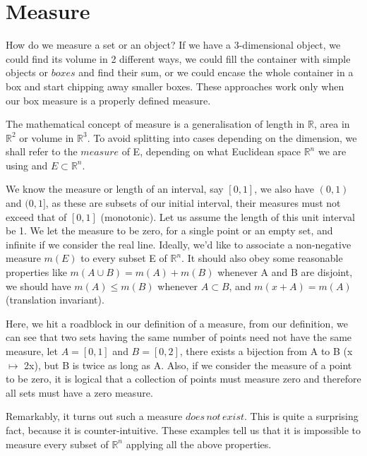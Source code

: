 \documentclass{article}
\begin{document}
\section{Measure}

How do we measure a set or an object? If we have a 3-dimensional object, we could find its volume in 2 different ways, we could fill the container with simple objects or $boxes$ and find their sum, or we could encase the whole container in a box and start chipping away smaller boxes. These approaches work only when our box measure is a properly defined measure.\medskip

The mathematical concept of measure is a generalisation of length in $\mathbb{R}$, area in $\mathbb{R}^2$ or volume in $\mathbb{R}^3$. To avoid splitting into cases depending on the dimension, we shall refer to the $measure$ of E, depending on what Euclidean space $\mathbb{R}^n$ we are using and $E \subset \mathbb{R}^n$.\medskip

We know the measure or length of an interval, say $[0,1]$, we also have $(0,1)$ and $(0,1]$, as these are subsets of our initial interval, their measures must not exceed that of $[0,1]$ (monotonic). Let us assume the length of this unit interval be 1. We let the measure to be zero, for a single point or an empty set, and infinite if we consider the real line. Ideally, we'd like to associate a non-negative measure $m(E)$ to every subset E of $\mathbb{R}^n$. It should also obey some reasonable properties like $m(A \cup B) = m(A) + m(B)$ whenever A and B are disjoint, we should have $m(A) \leq m(B)$ whenever $A \subset B$, and $m(x+A)=m(A)$ (translation invariant).\medskip

Here, we hit a roadblock in our definition of a measure, from our definition, we can see that two sets having the same number of points need not have the same measure, let $A=[0,1]$ and $B=[0,2]$, there exists a bijection from A to B (x $\mapsto$ 2x), but B is twice as long as A. Also, if we consider the measure of a point to be zero, it is logical that a collection of points must measure zero and therefore all sets must have a zero measure.\medskip
 
 Remarkably, it turns out such a measure $does \, not \,exist$. This is quite a surprising fact, because it is counter-intuitive. These examples tell us that it is impossible to measure every subset of $\mathbb{R}^n$ applying all the above properties.\medskip
 
\end{document}
